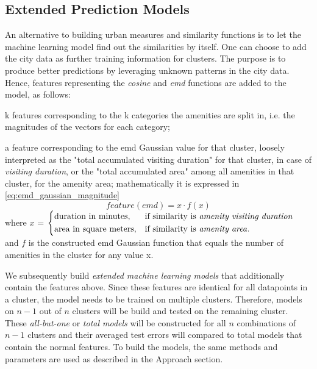 \documentclass{ws-ijait}
\begin{document}
		\subsection{Extended Prediction Models}
		An alternative to building urban measures and similarity functions is to let the machine learning model find out the similarities by itself. 
		One can choose to add the city data as further training information for clusters. The purpose is to produce better predictions by leveraging unknown patterns in the city data. Hence, features representing the \textit{cosine} and \textit{emd} functions are added to the model, as follows: 
		\begin{romanlist}
			\item k features corresponding to the k categories the amenities are split in, i.e. the magnitudes of the vectors for each category;
			\item a feature corresponding to the emd Gaussian value for that cluster, loosely interpreted as the "total accumulated visiting duration" for that cluster, in case of \textit{visiting duration}, or the "total accumulated area" among all amenities in that cluster, for the amenity area; mathematically it is expressed in \cref{eq:emd_gaussian_magnitude}
			\begin{equation}
			feature(emd)=x \cdot f(x)
			\label{eq:emd_gaussian_magnitude}
			\end{equation}
			{\centering
				where $x$ = 
				$
				\begin{dcases}
				\text{duration in minutes}, & \text{if similarity is \textit{amenity visiting duration}} \\
				\text{area in square meters}, & \text{if similarity is \textit{amenity area}}.
				\end{dcases}
				$ \\
				
				and $f$ is the constructed emd Gaussian function that equals the number of amenities in the cluster for any value x.}
		\end{romanlist}
		
		We subsequently build \textit{extended machine learning models} that additionally contain the features above. Since these features are identical for all datapoints in a cluster, the model needs to be trained on multiple clusters. Therefore, models on $n-1$ out of $n$ clusters will be build and tested on the remaining cluster. These \textit{all-but-one} or \textit{total models} will be constructed for all $n$ combinations of $n-1$ clusters and their averaged test errors will compared to total models that contain the normal features. To build the models, the same methods and parameters are used as described in the Approach section.
		
\end{document}

